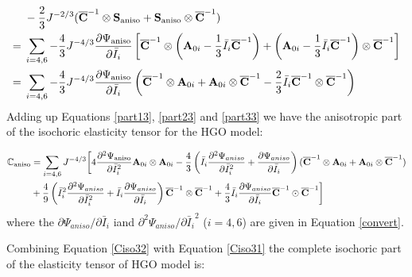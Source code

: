 \begin{equation} \label{part33}
\begin{split}
&-\frac{2}{3}J^{-2/3}({\overline{\bold{C}}}^{-1} \otimes \bold{S}_\mathrm{aniso} + \bold{S}_\mathrm{aniso} \otimes {\overline{\bold{C}}}^{-1}) \\
= {} &
\sum_{i = 4, 6} -\frac{4}{3}J^{-4/3}\frac{\partial\Psi_\mathrm{aniso}}{\partial\bar{I}_i}
\left[ \overline{\bold{C}}^{-1} \otimes \left( \bold{A}_{0i} - \frac{1}{3}\bar{I}_i \overline{\bold{C}}^{-1} \right)
+ \left( \bold{A}_{0i} - \frac{1}{3}\bar{I}_i \overline{\bold{C}}^{-1} \right) \otimes \overline{\bold{C}}^{-1} \right] \\
= {} & \sum_{i = 4, 6} -\frac{4}{3}J^{-4/3}\frac{\partial\Psi_\mathrm{aniso}}{\partial\bar{I}_i}
\left( \overline{\bold{C}}^{-1} \otimes \bold{A}_{0i} + \bold{A}_{0i} \otimes \overline{\bold{C}}^{-1} 
- \frac{2}{3} \bar{I}_i \overline{\bold{C}}^{-1} \otimes \overline{\bold{C}}^{-1} \right) \\
\end{split}
\end{equation}
Adding up Equations \ref{part13}, \ref{part23} and \ref{part33} we have the anisotropic part of the isochoric elasticity tensor for the HGO model:

\begin{equation} \label{Ciso31}
\begin{split}
\mathbb{C}_\mathrm{aniso} 
&= \sum_{i = 4, 6} J^{-4/3} \bigg[ 4\frac{\partial^2\Psi_\mathrm{aniso}}{\partial{\bar{I}_i}^2} \bold{A}_{0i} \otimes \bold{A}_{0i} - \frac{4}{3} \left( \bar{I}_i\frac{\partial^2\Psi_{aniso}}{\partial{\bar{I}_i}^2} + \frac{\partial\Psi_{aniso}}{\partial{\bar{I}_i}} \right) (\overline{\bold{C}}^{-1} \otimes \bold{A}_{0i} + \bold{A}_{0i} \otimes \overline{\bold{C}}^{-1}) \\
&+ \frac{4}{9} \left( {\bar{I}_i}^2\frac{\partial^2\Psi_{aniso}}{\partial{\bar{I}_i}^2} + \bar{I}_i\frac{\partial\Psi_{aniso}}{\partial{\bar{I}_i}} \right) \overline{\bold{C}}^{-1} \otimes \overline{\bold{C}}^{-1} 
+ \frac{4}{3}\bar{I}_i \frac{\partial\Psi_{aniso}}{\partial{\bar{I}_i}} \overline{\bold{C}}^{-1} \odot \overline{\bold{C}}^{-1} \bigg]
\end{split}
\end{equation}
where the $\partial\Psi_{aniso}/\partial{\bar{I}_i}$ iand $\partial^2\Psi_{aniso}/{\partial{\bar{I}_i}^2}$ ($i = 4, 6$) are given in Equation \ref{convert}.

Combining Equation \ref{Ciso32} with Equation \ref{Ciso31} the complete isochoric part of the elasticity tensor of HGO model is:


